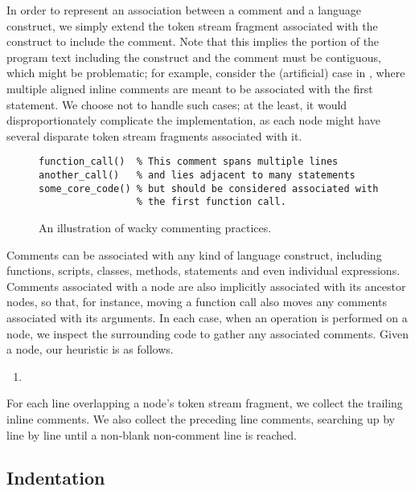 In order to represent an association between a comment and a language
construct, we simply extend the token stream fragment associated with the
construct to include the comment. Note that this implies the portion of the
program text including the construct and the comment must be contiguous,
which might be problematic; for example, consider the (artificial) case
in , where multiple aligned inline comments are
meant to be associated with the first statement. We choose not to handle
such cases; at the least, it would disproportionately complicate the
implementation, as each node might have several disparate token stream
fragments associated with it.

\begin{figure}
\begin{lstlisting}[numbers=none, keepspaces=true]
function_call()  % This comment spans multiple lines
another_call()   % and lies adjacent to many statements
some_core_code() % but should be considered associated with
                 % the first function call.
\end{lstlisting}
\caption{An illustration of wacky commenting practices.}
\label{Fig:WackyComments}
\end{figure}

Comments can be associated with any kind of language construct, including
functions, scripts, classes, methods, statements and even individual
expressions. Comments associated with a node are also implicitly associated
with its ancestor nodes, so that, for instance, moving a function call also
moves any comments associated with its arguments. In each case, when an
operation is performed on a node, we inspect the surrounding code to gather any
associated comments. Given a node, our heuristic is as follows.

\begin{enumerate}
  \item %
\end{enumerate}


For each line overlapping a
node's token stream fragment, we collect the trailing inline comments. We also
collect the preceding line comments, searching up by line by line until a
non-blank non-comment line is reached.

\subsection{Indentation}

